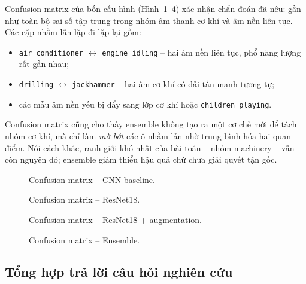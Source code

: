 Confusion matrix của bốn cấu hình (Hình~\ref{fig:cm_cnn}--\ref{fig:cm_ens}) xác
nhận chẩn đoán đã nêu: gần như toàn bộ sai số tập trung trong nhóm âm thanh cơ
khí và âm nền liên tục. Các cặp nhầm lẫn lặp đi lặp lại gồm:

\begin{itemize}[leftmargin=1.4em,itemsep=1pt]
  \item \texttt{air\_conditioner} $\leftrightarrow$ \texttt{engine\_idling} --
        hai âm nền liên tục, phổ năng lượng rất gần nhau;
  \item \texttt{drilling} $\leftrightarrow$ \texttt{jackhammer} -- hai âm cơ khí
        có dải tần mạnh tương tự;
  \item các mẫu âm nền yếu bị đẩy sang lớp cơ khí hoặc \texttt{children\_playing}.
\end{itemize}

Confusion matrix cũng cho thấy ensemble không tạo ra một cơ chế mới để tách nhóm
cơ khí, mà chỉ làm \textit{mờ bớt} các ô nhầm lẫn nhờ trung bình hóa hai quan
điểm. Nói cách khác, ranh giới khó nhất của bài toán -- nhóm machinery -- vẫn còn
nguyên đó; ensemble giảm thiểu hậu quả chứ chưa giải quyết tận gốc.

\begin{figure}[H]
  \centering
  \caption{Confusion matrix -- CNN baseline.}
  \label{fig:cm_cnn}
\end{figure}

\begin{figure}[H]
  \centering
  \caption{Confusion matrix -- ResNet18.}
  \label{fig:cm_resnet}
\end{figure}

\begin{figure}[H]
  \centering
  \caption{Confusion matrix -- ResNet18 + augmentation.}
  \label{fig:cm_aug}
\end{figure}

\begin{figure}[H]
  \centering
  \caption{Confusion matrix -- Ensemble.}
  \label{fig:cm_ens}
\end{figure}

\subsection{Tổng hợp trả lời câu hỏi nghiên cứu}

